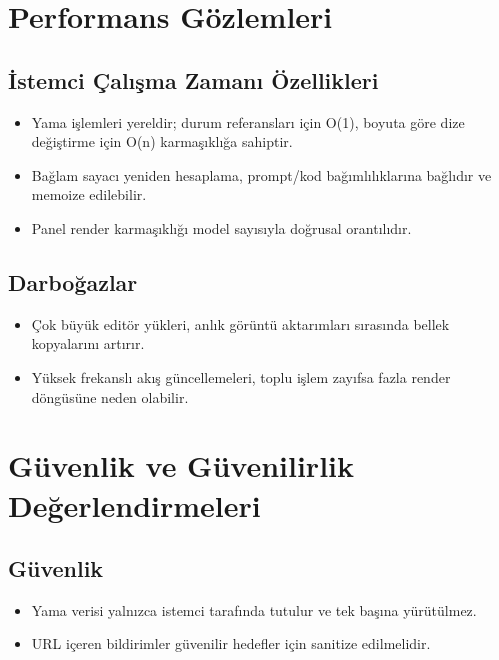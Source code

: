 \documentclass[12pt,a4paper]{article}
\begin{document}
\section{Performans Gözlemleri}

\subsection{İstemci Çalışma Zamanı Özellikleri}
\begin{itemize}[leftmargin=*]
  \item Yama işlemleri yereldir; durum referansları için O(1), boyuta göre dize değiştirme için O(n) karmaşıklığa sahiptir.
  \item Bağlam sayacı yeniden hesaplama, prompt/kod bağımlılıklarına bağlıdır ve memoize edilebilir.
  \item Panel render karmaşıklığı model sayısıyla doğrusal orantılıdır.
\end{itemize}

\subsection{Darboğazlar}
\begin{itemize}[leftmargin=*]
  \item Çok büyük editör yükleri, anlık görüntü aktarımları sırasında bellek kopyalarını artırır.
  \item Yüksek frekanslı akış güncellemeleri, toplu işlem zayıfsa fazla render döngüsüne neden olabilir.
\end{itemize}

\section{Güvenlik ve Güvenilirlik Değerlendirmeleri}

\subsection{Güvenlik}
\begin{itemize}[leftmargin=*]
  \item Yama verisi yalnızca istemci tarafında tutulur ve tek başına yürütülmez.
  \item URL içeren bildirimler güvenilir hedefler için sanitize edilmelidir.
\end{itemize}
\end{document}
